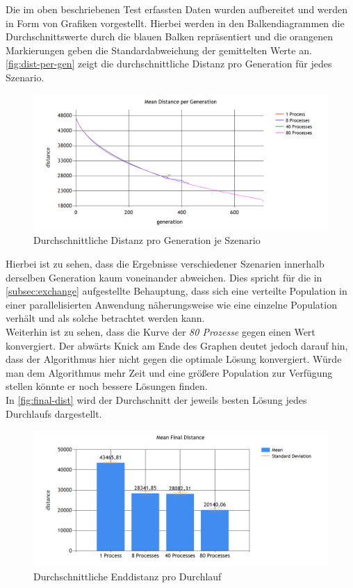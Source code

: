 \documentclass[12pt,a4paper]{scrreprt}
\newcommand{\absatz}{\\[12pt]}
\begin{document}
Die im oben beschriebenen Test erfassten Daten wurden aufbereitet und werden in Form von Grafiken vorgestellt. Hierbei werden in den Balkendiagrammen die Durchschnittswerte durch die blauen Balken repräsentiert und die orangenen Markierungen geben die Standardabweichung der gemittelten Werte an.\absatz
\autoref{fig:dist-per-gen} zeigt die durchschnittliche Distanz pro Generation für jedes Szenario.

\begin{figure}[ht]
  	\centering
	\includegraphics[width=400pt]{images/data_01_dist_per_gen.png}
	\caption{Durchschnittliche Distanz pro Generation je Szenario}
	\label{fig:dist-per-gen}
\end{figure}

Hierbei ist zu sehen, dass die Ergebnisse verschiedener Szenarien innerhalb derselben Generation kaum voneinander abweichen. Dies spricht für die in \autoref{subsec:exchange} aufgestellte Behauptung, dass sich eine verteilte Population in einer parallelisierten Anwendung näherungsweise wie eine einzelne Population verhält und als solche betrachtet werden kann.\\
Weiterhin ist zu sehen, dass die Kurve der \textit{80 Prozesse} gegen einen Wert konvergiert. Der abwärts Knick am Ende des Graphen deutet jedoch darauf hin, dass der Algorithmus hier nicht gegen die optimale Lösung konvergiert. Würde man dem Algorithmus mehr Zeit und eine größere Population zur Verfügung stellen könnte er noch bessere Lösungen finden.\absatz
In \autoref{fig:final-dist} wird der Durchschnitt der jeweils besten Lösung jedes Durchlaufs dargestellt.
\pagebreak

\begin{figure}[ht]
  	\centering
	\includegraphics[width=400pt]{images/data_02_final_dist.png}
	\caption{Durchschnittliche Enddistanz pro Durchlauf}
	\label{fig:final-dist}
\end{figure}
\end{document}
